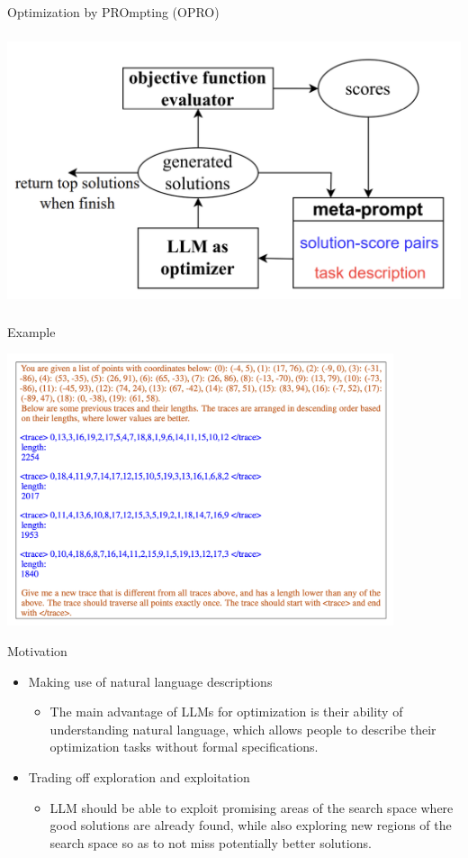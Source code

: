 \documentclass[aspectratio=1610,xcolor={dvipsnames},hyperref={colorlinks,unicode,linkcolor=violet,anchorcolor=BlueViolet,citecolor=YellowOrange,filecolor=black,urlcolor=Aquamarine}]{beamer}
\begin{document}
\begin{frame}[label={sec:org4cabf1a}]{Optimization by PROmpting (OPRO)}
\begin{center}
\includegraphics[height=8cm]{./p1.png}
\end{center}
\end{frame}
\begin{frame}[label={sec:org18277b0}]{Example}
\begin{center}
\includegraphics[height=8cm]{./p2.png}
\end{center}
\end{frame}
\begin{frame}[label={sec:org62ba67a}]{Motivation}
\begin{itemize}
\item Making use of natural language descriptions
\begin{itemize}
\item The main advantage of LLMs for optimization is their ability of understanding natural language, which allows people to describe their optimization tasks without formal specifications.
\end{itemize}
\item Trading off exploration and exploitation
\begin{itemize}
\item LLM should be able to exploit promising areas of the search space where good solutions are already found, while also exploring new regions of the search space so as to not miss potentially better solutions.
\end{itemize}
\end{itemize}
\end{frame}
\end{document}
